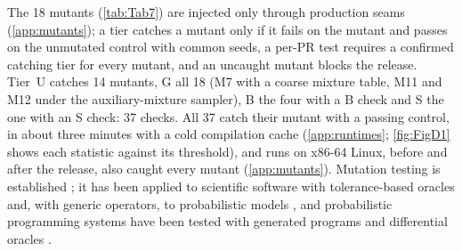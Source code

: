 The 18 mutants (\cref{tab:Tab7}) are injected only through production seams
(\cref{app:mutants}); a tier catches a mutant only if it fails on the mutant and passes on the
unmutated control with common seeds, a per-PR test requires a confirmed catching tier for every
mutant, and an uncaught mutant blocks the release. %
Tier~U catches 14 mutants, G all 18 (M7 with a coarse mixture table, M11 and M12 under the
auxiliary-mixture sampler), B the four with a B check and S the one with an S check: 37 checks. %
All 37 catch their mutant with a passing control, in about three minutes with a cold
compilation cache (\cref{app:runtimes}; \cref{fig:FigD1} shows each statistic against its threshold), %
and runs on x86-64 Linux, before and after the release, also caught every mutant
(\cref{app:mutants}). %
Mutation testing is established \citep{demillo1978hints,jia2011analysis}; it has been applied to
scientific software with tolerance-based oracles \citep{hook2009mutation} and, with generic
operators, to probabilistic models \citep{jarma2026software}, and probabilistic programming systems
have been tested with generated programs and differential oracles \citep{dutta2018testing}.
